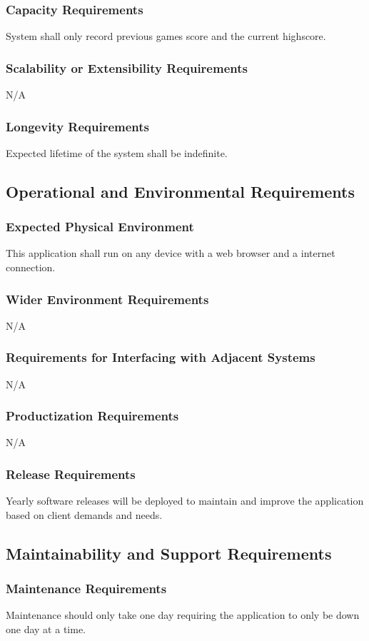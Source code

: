 \documentclass[12pt, titlepage]{article}
\begin{document}
\subsubsection{Capacity Requirements}
System shall only record previous games score and the current highscore.
\subsubsection{Scalability or Extensibility Requirements}
N/A
\subsubsection{Longevity Requirements}
Expected lifetime of the system shall be indefinite.

\subsection{Operational and Environmental Requirements}
\subsubsection{Expected Physical Environment}
This application shall run on any device with a web browser and a internet connection.
\subsubsection{Wider Environment Requirements}
N/A
\subsubsection{Requirements for Interfacing with Adjacent Systems}
N/A
\subsubsection{Productization Requirements}
N/A
\subsubsection{Release Requirements}
Yearly software releases will be deployed to maintain and improve the application based on client demands and needs.

\subsection{Maintainability and Support Requirements}
\subsubsection{Maintenance Requirements}
Maintenance should only take one day requiring the application to only be down one day at a time.
\end{document}
